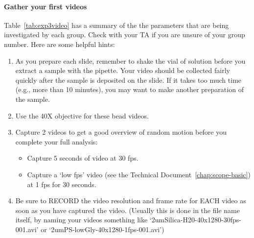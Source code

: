 \paragraph*{Gather your first videos} 
Table~\ref{tab:exp3video} has a summary of the the parameters that are being investigated by each group.
Check with your TA if you are unsure of your group number.
Here are some helpful hints:
\begin{enumerate}
\item As you prepare each slide, remember to shake the vial of solution before you extract a sample with the pipette. Your video should be collected fairly quickly after the sample is deposited on the slide. If it takes too much time (e.g., more than 10 minutes), you may want to make another preparation of the sample.
\item Use the 40X objective for these bead videos.
\item Capture 2 videos to get a good overview of random motion before you complete your full analysis:
\begin{itemize}
	\item Capture 5 seconds of video at 30 fps.
	\item Capture a `low fps' video (see the Technical Document~\ref{chap:scope-basic}) at 1 fps for 30 seconds. 
\end{itemize}
\item Be sure to RECORD the video resolution and frame rate for EACH video as soon as you have captured the video. (Usually this is done in the file name itself, by naming your videos something like `2umSilica-H20-40x1280-30fps-001.avi' or `2umPS-lowGly-40x1280-1fps-001.avi')
\end{enumerate}

